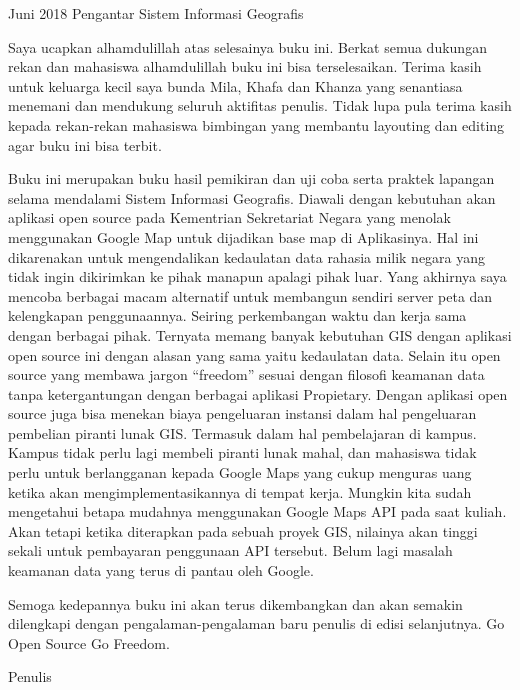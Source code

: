\documentclass{WileySix}
\begin{document}
\subtitle{Sejarah, Definisi dan Konsep Dasar}

\author{Rolly Maulana Awangga}

\halftitlepage
\titlepage



\begin{copyrightpage}{Juni 2018}
Pengantar Sistem Informasi Geografis
\end{copyrightpage}


\dedication{For my family Bunda, Khafayah dan Khanza}


\begin{preface}
	Saya ucapkan alhamdulillah atas selesainya buku ini. Berkat semua dukungan rekan dan mahasiswa alhamdulillah buku ini bisa terselesaikan. Terima kasih untuk keluarga kecil saya bunda Mila, Khafa dan Khanza yang senantiasa menemani dan mendukung seluruh aktifitas penulis. Tidak lupa pula terima kasih kepada rekan-rekan mahasiswa bimbingan yang membantu layouting dan editing agar buku ini bisa terbit.

	Buku ini merupakan buku hasil pemikiran dan uji coba serta praktek lapangan selama mendalami Sistem Informasi Geografis. Diawali dengan kebutuhan akan aplikasi open source pada Kementrian Sekretariat Negara yang menolak menggunakan Google Map untuk dijadikan base map di Aplikasinya. Hal ini dikarenakan untuk mengendalikan kedaulatan data rahasia milik negara yang tidak ingin dikirimkan ke pihak manapun apalagi pihak luar. Yang akhirnya saya mencoba berbagai macam alternatif untuk membangun sendiri server peta dan kelengkapan penggunaannya. Seiring perkembangan waktu dan kerja sama dengan berbagai pihak. Ternyata memang banyak kebutuhan GIS dengan aplikasi open source ini dengan alasan yang sama yaitu kedaulatan data. Selain itu open source yang membawa jargon “freedom” sesuai dengan filosofi keamanan data tanpa ketergantungan dengan berbagai aplikasi Propietary. Dengan aplikasi open source juga bisa menekan biaya pengeluaran instansi dalam hal pengeluaran pembelian piranti lunak GIS. Termasuk dalam hal pembelajaran di kampus. Kampus tidak perlu lagi membeli piranti lunak mahal, dan mahasiswa tidak perlu untuk berlangganan kepada Google Maps yang cukup menguras uang ketika akan mengimplementasikannya di tempat kerja. Mungkin kita sudah mengetahui betapa mudahnya menggunakan Google Maps API pada saat kuliah. Akan tetapi ketika diterapkan pada sebuah proyek GIS, nilainya akan tinggi sekali untuk pembayaran penggunaan API tersebut. Belum lagi masalah keamanan data yang terus di pantau oleh Google.

	Semoga kedepannya buku ini akan terus dikembangkan dan akan semakin dilengkapi dengan pengalaman-pengalaman baru penulis di edisi selanjutnya. Go Open Source Go Freedom.

Penulis	
\end{preface}
\end{document}
